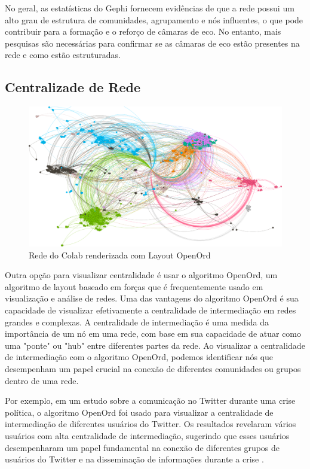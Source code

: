 No geral, as estatísticas do Gephi fornecem evidências de que a rede possui um alto grau de estrutura de comunidades, agrupamento e nós influentes, o que pode contribuir para a formação e o reforço de câmaras de eco. No entanto, mais pesquisas são necessárias para confirmar se as câmaras de eco estão presentes na rede e como estão estruturadas.

\subsection{Centralizade de Rede}

\begin{figure}[!hbtp]
	\caption{Rede do Colab renderizada com Layout OpenOrd}
	\label{fig:colab_openord}
	\centering
	\includegraphics[scale=0.20]{images/colab-openord.png}
	\fautor
\end{figure}

Outra opção para visualizar centralidade é usar o algoritmo OpenOrd, um algoritmo de layout baseado em forças que é frequentemente usado em visualização e análise de redes. Uma das vantagens do algoritmo OpenOrd é sua capacidade de visualizar efetivamente a centralidade de intermediação em redes grandes e complexas. A centralidade de intermediação é uma medida da importância de um nó em uma rede, com base em sua capacidade de atuar como uma "ponte" ou "hub" entre diferentes partes da rede. Ao visualizar a centralidade de intermediação com o algoritmo OpenOrd, podemos identificar nós que desempenham um papel crucial na conexão de diferentes comunidades ou grupos dentro de uma rede.

Por exemplo, em um estudo sobre a comunicação no Twitter durante uma crise política, o algoritmo OpenOrd foi usado para visualizar a centralidade de intermediação de diferentes usuários do Twitter. Os resultados revelaram vários usuários com alta centralidade de intermediação, sugerindo que esses usuários desempenharam um papel fundamental na conexão de diferentes grupos de usuários do Twitter e na disseminação de informações durante a crise \cite[text]{2011_Poblete_IP}.

